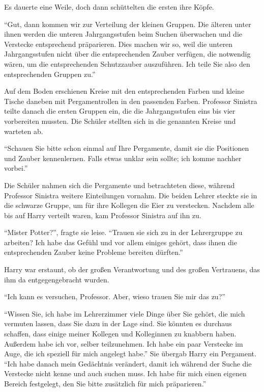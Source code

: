 Es dauerte eine Weile, doch dann schüttelten die ersten ihre Köpfe.

\enquote{Gut, dann kommen wir zur Verteilung der kleinen Gruppen. Die älteren unter ihnen werden die unteren Jahrgangsstufen beim Suchen überwachen und die Verstecke entsprechend präparieren. Dies machen wir so, weil die unteren Jahrgangsstufen nicht über die entsprechenden Zauber verfügen, die notwendig wären, um die entsprechenden Schutzzauber auszuführen. Ich teile Sie also den entsprechenden Gruppen zu.}

Auf dem Boden erschienen Kreise mit den entsprechenden Farben und kleine Tische daneben mit Pergamentrollen in den passenden Farben. Professor Sinistra teilte danach die ersten Gruppen ein, die die Jahrgangsstufen eins bis vier vorbereiten mussten. Die Schüler stellten sich in die genannten Kreise und warteten ab.

\enquote{Schauen Sie bitte schon einmal auf Ihre Pergamente, damit sie die Positionen und Zauber kennenlernen. Falls etwas unklar sein sollte; ich komme nachher vorbei.}

Die Schüler nahmen sich die Pergamente und betrachteten diese, während Professor Sinistra weitere Einteilungen vornahm. Die beiden Lehrer steckte sie in die schwarze Gruppe, um für ihre Kollegen die Eier zu verstecken. Nachdem alle bis auf Harry verteilt waren, kam Professor Sinistra auf ihn zu.

\enquote{Mister Potter?}, fragte sie leise. \enquote{Trauen sie sich zu in der Lehrergruppe zu arbeiten? Ich habe das Gefühl und vor allem einiges gehört, dass ihnen die entsprechenden Zauber keine Probleme bereiten dürften.}

Harry war erstaunt, ob der großen Verantwortung und des großen Vertrauens, das ihm da entgegengebracht wurden.

\enquote{Ich kann es versuchen, Professor. Aber, wieso trauen Sie mir das zu?}

\enquote{Wissen Sie, ich habe im Lehrerzimmer viele Dinge über Sie gehört, die mich vermuten lassen, dass Sie dazu in der Lage sind. Sie könnten es durchaus schaffen, dass einige meiner Kollegen und Kolleginnen zu knabbern haben. Außerdem habe ich vor, selber teilzunehmen. Ich habe ein paar Verstecke im Auge, die ich speziell für mich angelegt habe.} Sie übergab Harry ein Pergament. \enquote{Ich habe danach mein Gedächtnis verändert, damit ich während der Suche die Verstecke nicht kenne und auch suchen muss. Ich habe für mich einen eigenen Bereich festgelegt, den Sie bitte zusätzlich für mich präparieren.}


